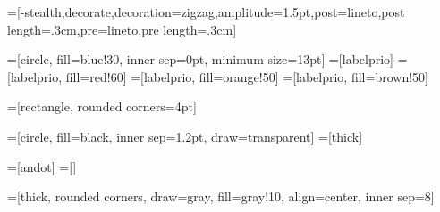 =[-stealth,decorate,decoration={zigzag,amplitude=1.5pt,post=lineto,post length=.3cm,pre=lineto,pre length=.3cm}]

=[circle, fill=blue!30, inner sep=0pt, minimum size=13pt]
=[labelprio]
=[labelprio, fill=red!60]
=[labelprio, fill=orange!50]
=[labelprio, fill=brown!50]

=[rectangle, rounded corners=4pt]

=[circle, fill=black, inner sep=1.2pt, draw=transparent]
=[thick]

=[andot] %
=[] %

=[thick, rounded corners, draw=gray, fill=gray!10, align=center,
  inner sep=8]
